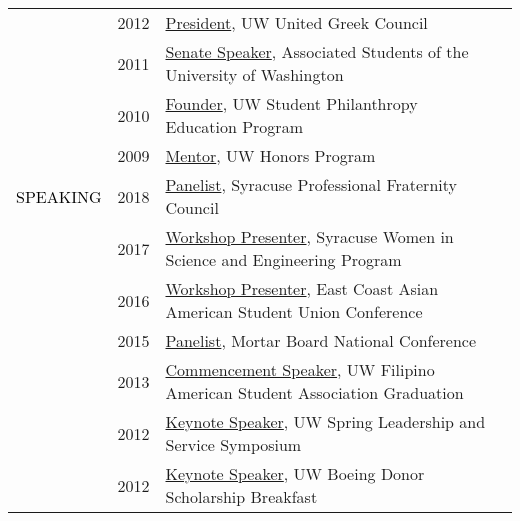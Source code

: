 \documentclass[12pt]{article}
\begin{document}
{{\begin{longtable}{Rp{1.0in}p{0.25in}p{4.75in}}
& \footnotesize{2012} & \href{http://www.dailyuw.com/news/article_3c781595-0b4d-52be-9a6e-b2c956ae72eb.html}{{President}}, UW United Greek Council \\

& \footnotesize{2011} & \href{http://www.dailyuw.com/news/article_da48b049-d2a0-582c-9dfb-4589755ff1e5.html}{{Senate Speaker}}, Associated Students of the University of Washington \\

& \footnotesize{2010} & \href{https://www.washington.edu/giving/get-involved/for-students/real-dawgs-give-back/}{{Founder}}, UW Student Philanthropy Education Program \\

& \footnotesize{2009} & \href{http://depts.washington.edu/uwhonors/community/grads/12\_13/\#bdosono}{{Mentor}}, UW Honors Program \\

\textcolor{black}{\footnotesize{\uppercase{Speaking}}} & \footnotesize{2018} & \href{https://www.facebook.com/events/170505843576915/}{{Panelist}}, Syracuse Professional Fraternity Council \\

& \footnotesize{2017} & \href{http://www.suwise.syr.edu/}{{Workshop Presenter}}, Syracuse Women in Science and Engineering Program \\

& \footnotesize{2016} & \href{http://www.ecaasu.org/}{{Workshop Presenter}}, East Coast Asian American Student Union Conference \\

& \footnotesize{2015} & \href{http://www.mortarboard.org/conference/}{{Panelist}}, Mortar Board National Conference \\

& \footnotesize{2013} & \href{http://youtu.be/uz1tukrR-7E}{{Commencement Speaker}}, UW Filipino American Student Association Graduation \\

& \footnotesize{2012} & \href{https://youtu.be/WMPhe6H7yiM}{{Keynote Speaker}}, UW Spring Leadership and Service Symposium \\

& \footnotesize{2012} & \href{https://web.archive.org/web/20170801205151/https://ischool.uw.edu/news/2012/04/bryan-dosono-informatics-student-speaks-boeing-scholarship-breakfast}{{Keynote Speaker}}, UW Boeing Donor Scholarship Breakfast \\


\end{longtable}}}
\end{document}
